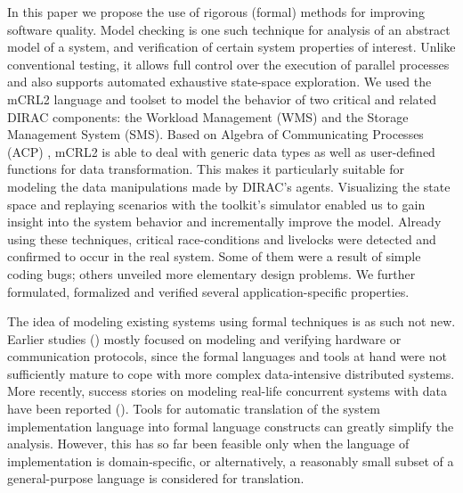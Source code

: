 \documentclass[10pt,conference]{IEEEtran}
\begin{document}
In this paper we propose the use of rigorous (formal) methods for improving
software quality. Model checking \cite{ProcessesWithData} is one such technique for analysis of an
abstract model of a system, and verification of certain system properties of
interest. Unlike conventional testing, it allows full control over the execution
of parallel processes and also supports automated exhaustive state-space
exploration. We used the mCRL2 language \cite{FormalLanguagemCRL2} and toolset \cite{mCRL2Toolset} to model the behavior of two
critical and related DIRAC components: the Workload Management (WMS) and the
Storage Management System (SMS). Based on Algebra of Communicating Processes
(ACP) \cite{process_algebra}, mCRL2 is able to deal with generic data types as well as user-defined
functions for data transformation. This makes it particularly suitable for
modeling the data manipulations made by DIRAC's agents. Visualizing the state
space and replaying scenarios with the toolkit's simulator enabled us to gain
insight into the system behavior and incrementally improve the model. 
Already using these techniques, critical race-conditions and livelocks were detected and confirmed to
occur in the real system. Some of them were a result of simple coding bugs;
others unveiled more elementary design problems. We further formulated,
formalized and verified several application-specific properties.

The idea of modeling existing systems using 
formal techniques is as such not new. Earlier studies
(\cite{SPIN_case_study,desing_validation_protocols,protocol_verification_muCRL,SLAMToolkit,SlidingWindowProtocol,DHCP_SPIN}) mostly focused
on modeling and verifying hardware or communication protocols, since
the formal languages and tools at hand were not sufficiently mature
to cope with more complex data-intensive distributed systems. More
recently, success stories on modeling real-life concurrent systems with
data have been reported (\cite{CMS_LHC, Linux_driver,verstoep_et_al, SystemC_processAlgebra}).
Tools for automatic translation of the system implementation language into
 formal language constructs can greatly
simplify the analysis. However, this has so far been feasible only when the
language of implementation is domain-specific, or alternatively, a
reasonably small subset of a general-purpose language is considered for
translation. 
\end{document}
